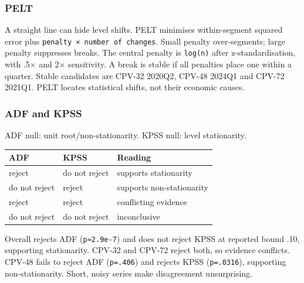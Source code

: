 \subsubsection{PELT}\label{pelt}

A straight line can hide level shifts. PELT minimises within-segment
squared error plus \texttt{penalty\ ×\ number\ of\ changes}. Small
penalty over-segments; large penalty suppresses breaks. The central
penalty is \texttt{log(n)} after z-standardisation, with .5× and 2×
sensitivity. A break is stable if all penalties place one within a
quarter. Stable candidates are CPV-32 2020Q2, CPV-48 2024Q1 and CPV-72
2021Q1. PELT locates statistical shifts, not their economic causes.

\subsubsection{ADF and KPSS}\label{adf-and-kpss}

ADF null: unit root/non-stationarity. KPSS null: level stationarity.

{\def\LTcaptype{none} %
\begin{longtable}[]{@{}
  >{\raggedright\arraybackslash}p{}
  >{\raggedright\arraybackslash}p{}
  >{\raggedright\arraybackslash}p{}@{}}
\toprule\noalign{}
\begin{minipage}[b]{\linewidth}\raggedright
ADF
\end{minipage} & \begin{minipage}[b]{\linewidth}\raggedright
KPSS
\end{minipage} & \begin{minipage}[b]{\linewidth}\raggedright
Reading
\end{minipage} \\
\midrule\noalign{}
\endhead
\bottomrule\noalign{}
\endlastfoot
reject & do not reject & supports stationarity \\
do not reject & reject & supports non-stationarity \\
reject & reject & conflicting evidence \\
do not reject & do not reject & inconclusive \\
\end{longtable}
}

Overall rejects ADF (\texttt{p≈2.9e-7}) and does not reject KPSS at
reported bound .10, supporting stationarity. CPV-32 and CPV-72 reject
both, so evidence conflicts. CPV-48 fails to reject ADF
(\texttt{p=.406}) and rejects KPSS (\texttt{p=.0316}), supporting
non-stationarity. Short, noisy series make disagreement unsurprising.

